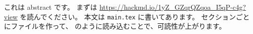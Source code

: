 これは abstract です。
まずは \url{https://hackmd.io/1yZ_GZqrQZqoa_I5qP-c4g?view} を読んでください。
本文は \texttt{main.tex} に書いてあります。
セクションごとにファイルを作って、\verb|| のように読み込むことで、可読性が上がります。
